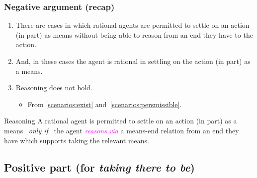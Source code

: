 \documentclass[noamssymb,
graphics,
]{beamer} %
\newcommand{\hand}{\ding{43}}
\newcommand{\schemaName}[1]{\textsf{#1}}
\newcommand{\hozlinedash}[0]{
  \noindent\hdashrule[0.5ex][c]{\textwidth}{.1pt}{2.5pt}
}
\begin{document}
\begin{frame}
  \frametitle{Negative argument (recap)}

  {%
  \begin{enumerate}
    \item There are cases in which rational agents are permitted to settle on an action (in part) as means without being able to reason from an end they have to the action.
  \item And, in these cases the agent is rational in settling on the action (in part) as a means.
  \item \schemaName{Reasoning} does not hold.
    \begin{itemize}
    \item From \ref{scenarios:exist} and~\ref{scenarios:persmissible}.
    \end{itemize}
  \end{enumerate}
  }

  \hozlinedash
  {%
    \begin{block}{Reasoning}
      A rational agent is permitted to settle on an action (in part) as a means
      \newline
      \mbox{ }\hfill\emph{only if}\hfill\mbox{ }
      \newline
      the agent \textcolor{fuchsia}{\emph{reasons via}}  a means-end relation from an end they have which supports taking the relevant means.
    \end{block}
  }
\end{frame}

\subsection{Positive part (for \emph{taking there to be})}%
\label{sec:positive}
\end{document}
